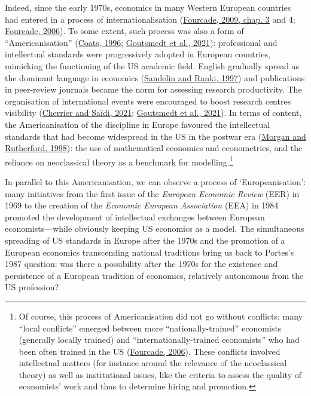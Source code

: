 \documentclass[]{elsarticle} %
\begin{document}
Indeed, since the early 1970s, economics in many Western European
countries had entered in a process of internationalisation
(\protect\hyperlink{ref-fourcade2009}{Fourcade, 2009, chap. 3} and 4;
\protect\hyperlink{ref-fourcade2006}{Fourcade, 2006}). To some extent,
such process was also a form of ``Americanisation''
(\protect\hyperlink{ref-coats1996}{Coats, 1996};
\protect\hyperlink{ref-goutsmedt2021}{Goutsmedt et al., 2021}):
professional and intellectual standards were progressively adopted in
European countries, mimicking the functioning of the US academic field.
English gradually spread as the dominant language in economics
(\protect\hyperlink{ref-sandelin1997}{Sandelin and Ranki, 1997}) and
publications in peer-review journals became the norm for assessing
research productivity. The organisation of international events were
encouraged to boost research centres visibility
(\protect\hyperlink{ref-cherrier2021}{Cherrier and Saïdi, 2021};
\protect\hyperlink{ref-goutsmedt2021}{Goutsmedt et al., 2021}). In terms
of content, the Americanisation of the discipline in Europe favoured the
intellectual standards that had become widespread in the US in the
postwar era (\protect\hyperlink{ref-morgan1998}{Morgan and Rutherford,
1998}): the use of mathematical economics and econometrics, and the
reliance on neoclassical theory as a benchmark for modelling.\footnote{Of
  course, this process of Americanisation did not go without conflicts:
  many ``local conflicts'' emerged between more ``nationally-trained''
  economists (generally locally trained) and ``internationally-trained
  economists'' who had been often trained in the US
  (\protect\hyperlink{ref-fourcade2006}{Fourcade, 2006}). These
  conflicts involved intellectual matters (for instance around the
  relevance of the neoclassical theory) as well as institutional issues,
  like the criteria to assess the quality of economists' work and thus
  to determine hiring and promotion.}

In parallel to this Americanisation, we can observe a process of
`Europeanisation': many initiatives from the first issue of the
\emph{European Economic Review} (EER) in 1969 to the creation of the
\emph{Economic European Association} (EEA) in 1984 promoted the
development of intellectual exchanges between European
economists---while obviously keeping US economics as a model. The
simultaneous spreading of US standards in Europe after the 1970s and the
promotion of a European economics transcending national traditions bring
us back to Portes's 1987 question: was there a possibility after the
1970s for the existence and persistence of a European tradition of
economics, relatively autonomous from the US profession?
\end{document}

